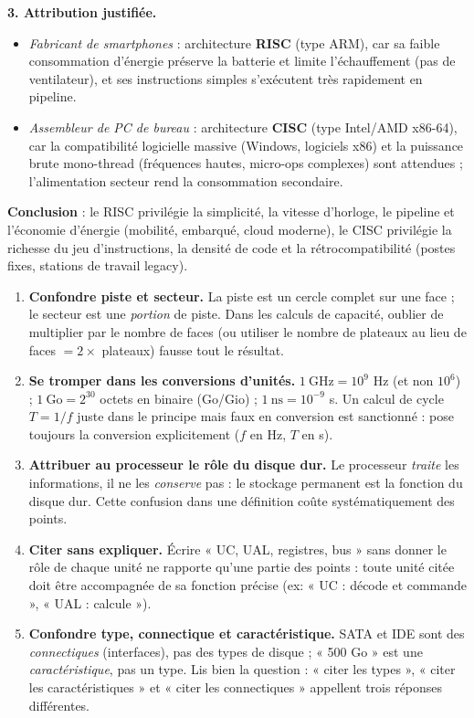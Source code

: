 \documentclass[11pt]{article}
\begin{document}
\begin{exoresolu}
\textbf{3. Attribution justifiée.}
\begin{itemize}
\item \emph{Fabricant de smartphones} : architecture \textbf{RISC} (type ARM), car sa faible consommation d'énergie préserve la batterie et limite l'échauffement (pas de ventilateur), et ses instructions simples s'exécutent très rapidement en pipeline.
\item \emph{Assembleur de PC de bureau} : architecture \textbf{CISC} (type Intel/AMD x86-64), car la compatibilité logicielle massive (Windows, logiciels x86) et la puissance brute mono-thread (fréquences hautes, micro-ops complexes) sont attendues ; l'alimentation secteur rend la consommation secondaire.
\end{itemize}
\textbf{Conclusion} : le RISC privilégie la simplicité, la vitesse d'horloge, le pipeline et l'économie d'énergie (mobilité, embarqué, cloud moderne), le CISC privilégie la richesse du jeu d'instructions, la densité de code et la rétrocompatibilité (postes fixes, stations de travail legacy).
\end{exoresolu}

\begin{attention}
\begin{enumerate}
\item \textbf{Confondre piste et secteur.} La piste est un cercle complet sur une face ; le secteur est une \emph{portion} de piste. Dans les calculs de capacité, oublier de multiplier par le nombre de faces (ou utiliser le nombre de plateaux au lieu de faces $= 2 \times$ plateaux) fausse tout le résultat.
\item \textbf{Se tromper dans les conversions d'unités.} $1~\text{GHz} = 10^{9}$ Hz (et non $10^6$) ; $1~\text{Go} = 2^{30}$ octets en binaire (Go/Gio) ; $1~\text{ns} = 10^{-9}$ s. Un calcul de cycle $T = 1/f$ juste dans le principe mais faux en conversion est sanctionné : pose toujours la conversion explicitement ($f$ en Hz, $T$ en s).
\item \textbf{Attribuer au processeur le rôle du disque dur.} Le processeur \emph{traite} les informations, il ne les \emph{conserve} pas : le stockage permanent est la fonction du disque dur. Cette confusion dans une définition coûte systématiquement des points.
\item \textbf{Citer sans expliquer.} Écrire « UC, UAL, registres, bus » sans donner le rôle de chaque unité ne rapporte qu'une partie des points : toute unité citée doit être accompagnée de sa fonction précise (ex: « UC : décode et commande », « UAL : calcule »).
\item \textbf{Confondre type, connectique et caractéristique.} SATA et IDE sont des \emph{connectiques} (interfaces), pas des types de disque ; « 500 Go » est une \emph{caractéristique}, pas un type. Lis bien la question : « citer les types », « citer les caractéristiques » et « citer les connectiques » appellent trois réponses différentes.
\end{enumerate}
\end{attention}
\end{document}
